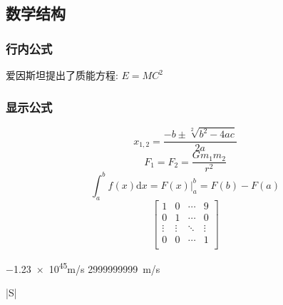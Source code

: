 \documentclass[twocolumn]{ctexart}
\begin{document}
            \subsection{数学结构}
                \subsubsection{行内公式}
                    爱因斯坦提出了质能方程: $E = MC^2$
                \subsubsection{显示公式}
                $$x_{1,2} = \frac{-b \pm \sqrt[2]{b^2 - 4ac}}{2a}$$
                \begin{equation}
                    F_1 = F_2 = \frac{Gm_1m_2}{r^2}
                \end{equation}
                \begin{equation}
                    \int_a^b f(x) \mathrm{d}x = F(x) |_a^b = F(b) - F(a)
                \end{equation}
                \[
                    \begin{bmatrix}
                        1 & 0 & \cdots & 9 \\
                        0 & 1 & \cdots & 0 \\
                        \vdots & \vdots & \ddots & \vdots \\
                        0 & 0 & \cdots & 1 \\
                    \end{bmatrix}  
                \]

                \num{-1.23e45}{m/s}
                \SI{2999999999}{m/s}\\
                \begin{tabular}{|S|}
                    \\
                    \\
                    \hline
                \end{tabular} 
\end{document}
